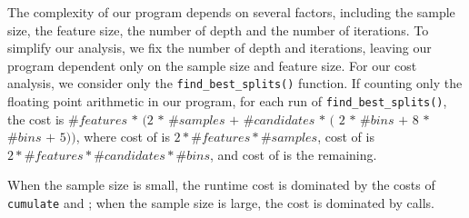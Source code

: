 The complexity of our program depends on several factors, including the sample size, the feature size, the number of depth and the number of iterations. To simplify our analysis, we fix the number of depth and iterations, leaving our program dependent only on the sample size and feature size. For our cost analysis, we consider only the \texttt{find\_best\_splits()} function. If counting only the floating point arithmetic in our program, for each run of \texttt{find\_best\_splits()}, the cost is $\#features$ $*$ $(2$ $*$ $\#samples$ $+$ $\#candidates$ $*$ $($ $2$ $*$ $\#bins$ $+$ $8$ $*$ $\#bins$ $+$ $5))$, where cost of \update is $2 * \#features * \#samples$, cost of \cumulate is $2 * \#features * \#candidates * \#bins$, and cost of \getbestsplit is the remaining.

When the sample size is small, the runtime cost is dominated by the costs of \texttt{cumulate} and \getbestsplit; when the sample size is large, the cost is dominated by \update calls.
